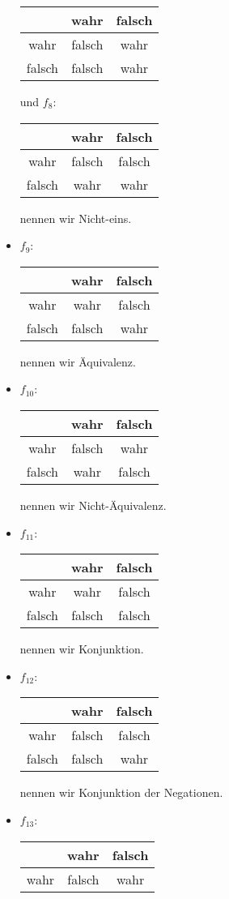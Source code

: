\begin{solution}
\begin{itemize}
\begin{tabular}{|c|c|c|}
& wahr & falsch \\
\hline
wahr & falsch & wahr \\
\hline
falsch & falsch & wahr\\
\hline
\end{tabular} und
$f_8$:\quad\begin{tabular}{|c|c|c|}
\hline
& wahr & falsch \\
\hline
wahr & falsch & falsch \\
\hline
falsch & wahr & wahr\\
\hline
\end{tabular} nennen wir Nicht-eins.
 \item
 $f_9$:\quad\begin{tabular}{|c|c|c|}
 \hline
 & wahr & falsch \\
 \hline
 wahr & wahr & falsch \\
 \hline
 falsch & falsch & wahr\\
 \hline
 \end{tabular} nennen wir Äquivalenz.
 \item
 $f_{10}$:\quad\begin{tabular}{|c|c|c|}
 \hline
 & wahr & falsch \\
 \hline
 wahr & falsch & wahr \\
 \hline
 falsch & wahr & falsch\\
 \hline
 \end{tabular} nennen wir Nicht-Äquivalenz.
 \item
 $f_{11}$:\quad\begin{tabular}{|c|c|c|}
 \hline
 & wahr & falsch \\
 \hline
 wahr & wahr & falsch \\
 \hline
 falsch & falsch & falsch\\
 \hline
 \end{tabular} nennen wir Konjunktion.
 \item
 $f_{12}$:\quad\begin{tabular}{|c|c|c|}
 \hline
 & wahr & falsch \\
 \hline
 wahr & falsch & falsch \\
 \hline
 falsch & falsch & wahr\\
 \hline
 \end{tabular} nennen wir Konjunktion der Negationen.
 \item
 $f_{13}$:\quad\begin{tabular}{|c|c|c|}
 \hline
 & wahr & falsch \\
 \hline
 wahr & falsch & wahr \\

\end{tabular}
\end{itemize}
\end{solution}
